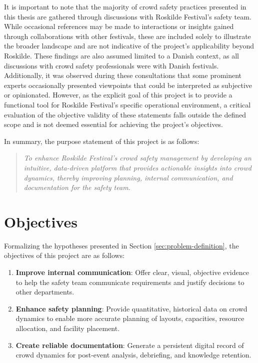 It is important to note that the majority of crowd safety practices presented in this thesis are gathered through discussions with Roskilde Festival's safety team. While occasional references may be made to interactions or insights gained through collaborations with other festivals, these are included solely to illustrate the broader landscape and are not indicative of the project's applicability beyond Roskilde. These findings are also assumed limited to a Danish context, as all discussions with crowd safety professionals were with Danish festivals. Additionally, it was observed during these consultations that some prominent experts occasionally presented viewpoints that could be interpreted as subjective or opinionated. However, as the explicit goal of this project is to provide a functional tool for Roskilde Festival's specific operational environment, a critical evaluation of the objective validity of these statements falls outside the defined scope and is not deemed essential for achieving the project's objectives.

In summary, the purpose statement of this project is as follows:
\begin{quote}
  \textit{To enhance Roskilde Festival's crowd safety management by developing an intuitive, data-driven platform that provides actionable insights into crowd dynamics, thereby improving planning, internal communication, and documentation for the safety team.}
\end{quote}

\section{Objectives}
\label{sec:objectives}

Formalizing the hypotheses presented in Section \ref{sec:problem-definition}, the objectives of this project are as follows:
\begin{enumerate}
  \item \textbf{Improve internal communication}: Offer clear, visual, objective evidence to help the safety team communicate requirements and justify decisions to other departments.
  \item \textbf{Enhance safety planning}: Provide quantitative, historical data on crowd dynamics to enable more accurate planning of layouts, capacities, resource allocation, and facility placement.
  \item \textbf{Create reliable documentation}: Generate a persistent digital record of crowd dynamics for post-event analysis, debriefing, and knowledge retention.
\end{enumerate}

